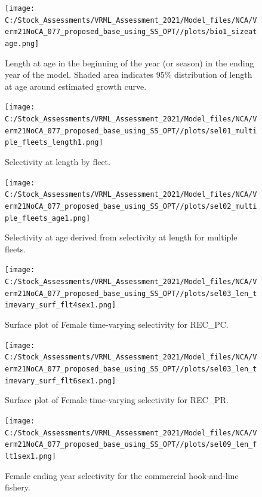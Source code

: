 \documentclass[
  english,
  a4paper,
]{article}
\begin{document}
\FloatBarrier

\begin{figure}
\centering
\texttt{[image: C:/Stock\_Assessments/VRML\_Assessment\_2021/Model\_files/NCA/Verm21NoCA\_077\_proposed\_base\_using\_SS\_OPT//plots/bio1\_sizeatage.png]}
\caption{Length at age in the beginning of the year (or season) in the ending year of the model. Shaded area indicates 95\% distribution of length at age around estimated growth curve.\label{fig:fittedgrowth}}
\end{figure}

\FloatBarrier

\begin{figure}
\centering
\texttt{[image: C:/Stock\_Assessments/VRML\_Assessment\_2021/Model\_files/NCA/Verm21NoCA\_077\_proposed\_base\_using\_SS\_OPT//plots/sel01\_multiple\_fleets\_length1.png]}
\caption{Selectivity at length by fleet.\label{fig:selex-length-all}}
\end{figure}

\FloatBarrier

\begin{figure}
\centering
\texttt{[image: C:/Stock\_Assessments/VRML\_Assessment\_2021/Model\_files/NCA/Verm21NoCA\_077\_proposed\_base\_using\_SS\_OPT//plots/sel02\_multiple\_fleets\_age1.png]}
\caption{Selectivity at age derived from selectivity at length for multiple fleets.\label{fig:selex-age-all}}
\end{figure}

\begin{figure}
\centering
\texttt{[image: C:/Stock\_Assessments/VRML\_Assessment\_2021/Model\_files/NCA/Verm21NoCA\_077\_proposed\_base\_using\_SS\_OPT//plots/sel03\_len\_timevary\_surf\_flt4sex1.png]}
\caption{Surface plot of Female time-varying selectivity for REC\_PC.\label{fig:sel03_len_timevary_surf_flt4sex1}}
\end{figure}

\begin{figure}
\centering
\texttt{[image: C:/Stock\_Assessments/VRML\_Assessment\_2021/Model\_files/NCA/Verm21NoCA\_077\_proposed\_base\_using\_SS\_OPT//plots/sel03\_len\_timevary\_surf\_flt6sex1.png]}
\caption{Surface plot of Female time-varying selectivity for REC\_PR.\label{fig:sel03_len_timevary_surf_flt6sex1}}
\end{figure}

\FloatBarrier

\FloatBarrier

\begin{figure}
\centering
\texttt{[image: C:/Stock\_Assessments/VRML\_Assessment\_2021/Model\_files/NCA/Verm21NoCA\_077\_proposed\_base\_using\_SS\_OPT//plots/sel09\_len\_flt1sex1.png]}
\caption{Female ending year selectivity for the commercial hook-and-line fishery.\label{fig:endyr-selex-COM-HKL}}
\end{figure}
\end{document}

